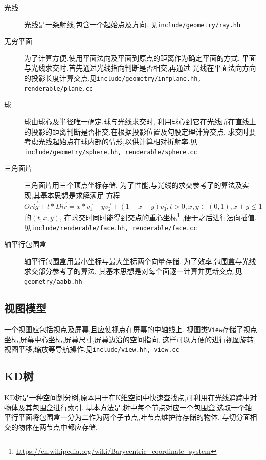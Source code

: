 \begin{description}
  \item[光线]光线是一条射线,包含一个起始点及方向. 见\verb|include/geometry/ray.hh|
  \item[无穷平面]
    为了计算方便,使用平面法向及平面到原点的距离作为确定平面的方式.
    平面与光线求交时,首先通过光线指向判断是否相交,再通过
    光线在平面法向方向的投影长度计算交点.见\verb|include/geometry/infplane.hh, renderable/plane.cc|

  \item[球]球由球心及半径唯一确定.球与光线求交时,
    利用球心到它在光线所在直线上的投影的距离判断是否相交,在根据投影位置及勾股定理计算交点.
    求交时要考虑光线起始点在球内部的情形,以供计算相对折射率.见\verb|include/geometry/sphere.hh, renderable/sphere.cc|

  \item[三角面片]三角面片用三个顶点坐标存储.
    为了性能,与光线的求交参考了\cite{triangle, triangle_code}的算法及实现,其基本思想是求解满足
    方程
    \[  \overrightarrow{Orig} + t * \overrightarrow{Dir} = x * \overrightarrow{v_1} + y  \overrightarrow{v_2} + (1 - x -
    y)\overrightarrow{v_3}, t > 0, x, y \in (0, 1), x + y \le 1\]
    的$ (t, x, y)$, 在求交时同时能得到交点的重心坐标\footnote{\url{https://en.wikipedia.org/wiki/Barycentric\_coordinate\_system}}
    ,便于之后进行法向插值.见\verb|include/renderable/face.hh, renderable/face.cc|

  \item[轴平行包围盒]
    轴平行包围盒用最小坐标与最大坐标两个向量存储.
    为了效率,包围盒与光线求交部分参考了\cite{aabb}的算法.
    其基本思想是对每个面逐一计算并更新交点.见\verb|geometry/aabb.hh|
\end{description}


\subsection{视图模型}
一个视图应包括视点及屏幕,且应使视点在屏幕的中轴线上.
视图类\verb|View|存储了视点坐标,屏幕中心坐标,屏幕尺寸,屏幕边沿的空间指向,
这样可以方便的进行视图旋转,视图平移,缩放等导航操作.见\verb|include/view.hh, view.cc|

\subsection{KD树}
KD树是一种空间划分树,原本用于在K维空间中快速查找点,可利用在光线追踪中对物体及其包围盒进行索引.
基本方法是,树中每个节点对应一个包围盒,选取一个轴平行平面将包围盒一分为二作为两个子节点,叶节点维护待存储的物体.
与切分面相交的物体在两节点中都应存储.

